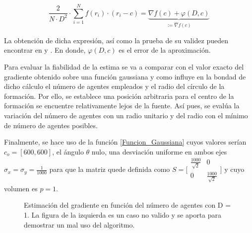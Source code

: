 \begin{equation}\label{Fun_Esti}
	\frac{2}{N\cdot{D}^2}\cdot\sum_{i=1}^{N}f(r_{i})\cdot(r_{i}-c)=\underbrace{\nabla{f}\left(c\right) + \varphi\left(D,c\right)}_{:=\hat{\nabla}{f}\left(c\right)}
\end{equation}

La obtención de dicha expresión, así como la prueba de su validez pueden encontrar en \cite{Estimacion_Gradiente} y \cite{Adicional_Estimacion_1}. En donde, $\varphi\left(D,c\right)$ es el error de la aproximación. 

Para evaluar la fiabilidad de la estima se va a comparar con el valor exacto del gradiente obtenido sobre una función gaussiana y como influye en la bondad de dicho cálculo el número de agentes empleados y el radio del círculo de la formación. Por ello, se establece una posición arbitraria para el centro de la formación  se encuentre relativamente lejos de la fuente. Así pues, se evalúa la variación del número de agentes con un radio unitario y del radio con el mínimo de número de agentes posibles.

Finalmente, se hace uso de la función \ref{Funcion_Gaussiana} cuyos valores serían $c_{o}=[600,600]$, el ángulo $\theta$ nulo, una desviación uniforme en ambos ejes $\sigma_{x}=\sigma_{y}=\frac{1}{1000}$ para que la matriz quede definida como $S = \bigl[\begin{smallmatrix}\frac{1000}{\sqrt{2}} & 0\\ 0 & \frac{1000}{\sqrt{2}}\end{smallmatrix}\bigr]$  y cuyo volumen es $p = 1$. 

\begin{figure}[H]
  \begin{center}
    \caption{Estimación del gradiente en función del número de agentes con D = 1. La figura de la izquierda es un caso no valido y se aporta para demostrar un mal uso del algoritmo.}
    \label{NAGENTSEST}
  \end{center}
\end{figure}

